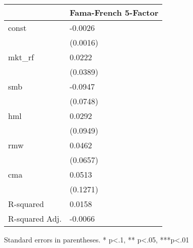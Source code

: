 \begin{table}
\caption{}
\label{}
\begin{center}
\begin{tabular}{ll}
\hline
               & Fama-French 5-Factor  \\
\hline
const          & -0.0026               \\
               & (0.0016)              \\
mkt\_rf        & 0.0222                \\
               & (0.0389)              \\
smb            & -0.0947               \\
               & (0.0748)              \\
hml            & 0.0292                \\
               & (0.0949)              \\
rmw            & 0.0462                \\
               & (0.0657)              \\
cma            & 0.0513                \\
               & (0.1271)              \\
R-squared      & 0.0158                \\
R-squared Adj. & -0.0066               \\
\hline
\end{tabular}
\end{center}
\end{table}
\bigskip
Standard errors in parentheses. \newline 
* p<.1, ** p<.05, ***p<.01